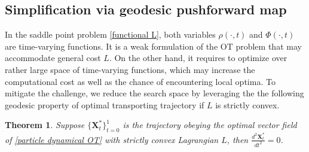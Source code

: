 \documentclass{article}
\newcommand{\zha}[1]{{\color{red} Zha: #1}}
\newtheorem{theorem}{Theorem}
\begin{document}



\subsection{Simplification via geodesic pushforward map}\label{geodesic pushforward}
In the saddle point problem \eqref{functional L}, both variables $\rho(\cdot,t)$ and $\Phi(\cdot,t)$ are time-varying functions. It is a weak formulation of the OT problem that may accommodate general cost $L$. On the other hand, it requires to optimize over rather large space of time-varying functions, which may increase the computational cost as well as the chance of encountering local optima. %
To mitigate the challenge, we reduce the search space by leveraging the the following geodesic property of optimal transporting trajectory if $L$ is strictly convex. 
\begin{theorem}\label{transport along geod}
    Suppose $\{\boldsymbol{X}^*_t\}_{t=0}^1$ is the trajectory obeying the optimal vector field of \eqref{particle dynamical OT} with strictly convex Lagrangian $L$, then $\frac{d^2\boldsymbol{X}^*_t}{dt^2}=0$.
\end{theorem}
\end{document}
